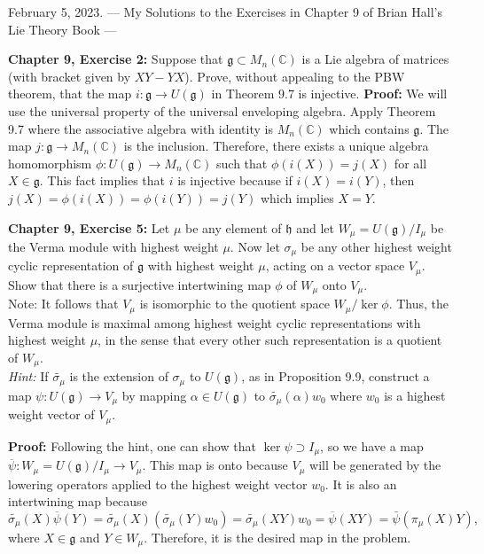 February 5, 2023.
---
My Solutions to the Exercises in Chapter 9 of Brian Hall's Lie Theory Book
---

\textbf{Chapter 9, Exercise 2: }Suppose that $\mathfrak{g} \subset M_n(\mathbb{C})$ is a Lie algebra of matrices (with bracket given by $XY-YX$). Prove, without appealing to the PBW theorem, that the map $i:\mathfrak{g}\to U(\mathfrak{g})$ in Theorem 9.7 is injective.
\textbf{Proof: }
We will use the universal property of the universal enveloping algebra. Apply Theorem 9.7 where the associative algebra with identity is $M_n(\mathbb{C})$ which contains $\mathfrak{g}$. The map $j:\mathfrak{g}\to M_n(\mathbb{C})$ is the inclusion. Therefore, there exists a unique algebra homomorphism $\phi: U(\mathfrak{g}) \to M_n(\mathbb{C})$ such that $\phi(i(X)) = j(X)$ for all $X\in \mathfrak{g}$. This fact implies that $i$ is injective because if $i(X) = i(Y)$, then $j(X) = \phi(i(X)) = \phi(i(Y)) = j(Y)$ which implies $X=Y$.

\textbf{Chapter 9, Exercise 5: } Let $\mu$ be any element of $\mathfrak{h}$ and let $W_\mu = U(\mathfrak{g})/I_\mu$ be the Verma module with
highest weight $\mu$. Now let $\sigma_\mu$ be any other highest weight cyclic representation of $\mathfrak{g}$ with highest weight $\mu$, acting on a vector space $V_\mu$. Show that there is a surjective intertwining map $\phi$ of $W_\mu$ onto $V_\mu$.\\
Note: It follows that $V_\mu$ is isomorphic to the quotient space $W_\mu/\ker \phi$. Thus, the Verma module is maximal among highest weight cyclic representations with highest weight $\mu$, in the sense that every other such representation is a quotient of $W_\mu.$\\
\emph{Hint: } If $\tilde{\sigma_\mu}$ is the extension of $\sigma_\mu$ to $U(\mathfrak{g})$, as in Proposition 9.9, construct a map $\psi: U(\mathfrak{g}) \to V_\mu$ by mapping $\alpha \in U(\mathfrak{g})$ to $\tilde{\sigma_\mu}(\alpha)w_0$ where $w_0$ is a highest weight vector of $V_\mu$.

\textbf{Proof: }
Following the hint, one can show that $\ker \psi \supset I_\mu$, so we have a map $\overline{\psi}:W_\mu = U(\mathfrak{g})/I_\mu \to V_\mu.$ This map is onto because $V_\mu$ will be generated by the lowering operators applied to the highest weight vector $w_0$. It is also an intertwining map because $$\tilde{\sigma_\mu}(X)\overline{\psi}(Y) = \tilde{\sigma_\mu}(X)(\tilde{\sigma_\mu}(Y)w_0) = \tilde{\sigma_\mu}(XY)w_0 = \overline{\psi}(XY) = \bar{\psi}(\pi_\mu(X)Y),$$
where $X\in \mathfrak{g}$ and $Y\in W_\mu$. Therefore, it is the desired map in the problem.